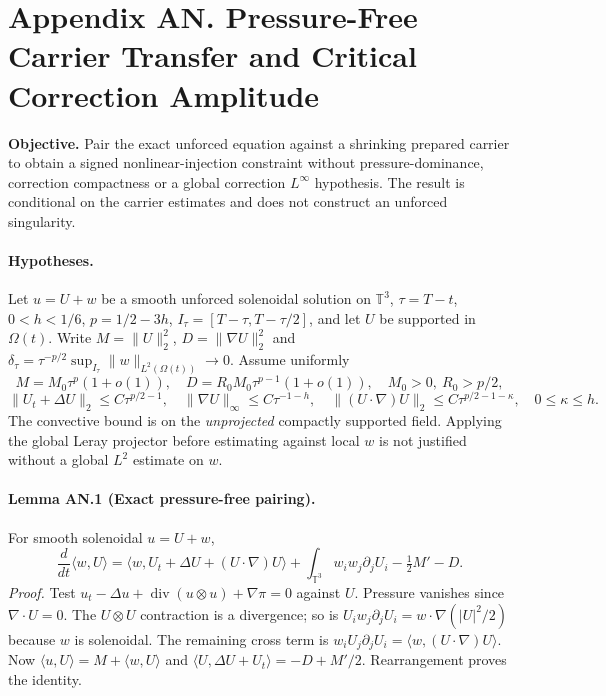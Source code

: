 \clearpage
\section*{Appendix AN. Pressure-Free Carrier Transfer and Critical Correction Amplitude}
\noindent\textbf{Objective.} Pair the exact unforced equation against a shrinking prepared carrier to obtain a signed nonlinear-injection constraint without pressure-dominance, correction compactness or a global correction $L^\infty$ hypothesis. The result is conditional on the carrier estimates and does not construct an unforced singularity.

\paragraph{Hypotheses.}
Let $u=U+w$ be a smooth unforced solenoidal solution on $\mathbb T^3$, $\tau=T-t$, $0<h<1/6$, $p=1/2-3h$, $I_\tau=[T-\tau,T-\tau/2]$, and let $U$ be supported in $\Omega(t)$.
Write $M=\|U\|_2^2$, $D=\|\nabla U\|_2^2$ and
$\delta_\tau=\tau^{-p/2}\sup_{I_\tau}\|w\|_{L^2(\Omega(t))}\to0$.
Assume uniformly
\[
M=M_0\tau^p(1+o(1)),\quad
D=R_0M_0\tau^{p-1}(1+o(1)),\quad M_0>0,\ R_0>p/2,
\]
\[
\|U_t+\Delta U\|_2\le C\tau^{p/2-1},\quad
\|\nabla U\|_\infty\le C\tau^{-1-h},\quad
\|(U\cdot\nabla)U\|_2\le C\tau^{p/2-1-\kappa},\quad0\le\kappa\le h.
\]
The convective bound is on the \emph{unprojected} compactly supported field. Applying the global Leray projector before estimating against local $w$ is not justified without a global $L^2$ estimate on $w$.

\paragraph{Lemma AN.1 (Exact pressure-free pairing).}
For smooth solenoidal $u=U+w$,
\[
\boxed{
\frac{d}{dt}\langle w,U\rangle
=\langle w,U_t+\Delta U+(U\cdot\nabla)U\rangle
+\int_{\mathbb T^3}w_iw_j\partial_jU_i
-\tfrac12M'-D.}
\]
\emph{Proof.}
Test $u_t-\Delta u+\operatorname{div}(u\otimes u)+\nabla\pi=0$
against $U$. Pressure vanishes since $\nabla\cdot U=0$.
The $U\otimes U$ contraction is a divergence; so is
$U_iw_j\partial_jU_i=w\cdot\nabla(|U|^2/2)$ because $w$ is solenoidal.
The remaining cross term is
$w_iU_j\partial_jU_i=\langle w,(U\cdot\nabla)U\rangle$.
Now $\langle u,U\rangle=M+\langle w,U\rangle$ and
$\langle U,\Delta U+U_t\rangle=-D+M'/2$. Rearrangement proves the identity.


